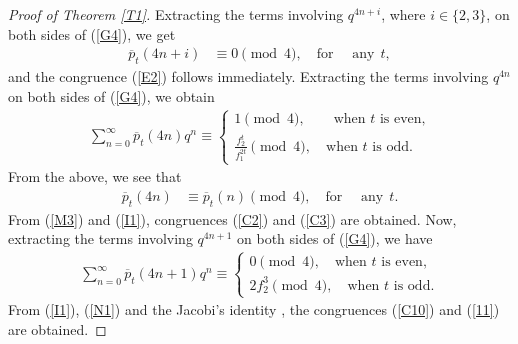\documentclass[12pt,reqno,a4paper]{amsart}
\numberwithin{equation}{section}
\begin{document}
\begin{proof}[Proof of Theorem \ref{T1}]
 Extracting the terms involving $q^{4n+i}$, where $i\in\{2,3\}$, on both sides of (\ref{G4}), we get
\begin{align}
       \label{M3} \overline{p}_{t}(4n+i)& \equiv 0\pmod{4}, \quad \textrm{for ~~ any} ~~ t,
    \end{align}
 and the congruence (\ref{E2}) follows immediately. Extracting the terms involving  $q^{4n}$ on both sides of (\ref{G4}), we obtain
     \begin{align*}
   \sum_{n=0}^\infty\overline{p}_{t}(4n)q^n\equiv \begin{cases}
       1 \pmod{4},\qquad \text{when $t$ is even,}\\
         \frac{f_2^{t}}{f_1^{2t}}\pmod{4},\quad \text{when $t$ is odd.}
   \end{cases}
\end{align*}
From the above, we see that
\begin{align}
     \label{I1}\overline{p}_{t}(4n)& \equiv \overline{p}_{t}(n)\pmod{4}, \quad \textrm{for ~~ any} ~~ t.
\end{align}
From (\ref{M3}) and (\ref{I1}), congruences (\ref{C2}) and (\ref{C3}) are obtained. Now, extracting the terms involving  $q^{4n+1}$ on both sides of (\ref{G4}), we have
  \begin{align}
  \label{N1}\sum_{n=0}^\infty\overline{p}_{t}(4n+1)q^n\equiv \begin{cases}
         0 \pmod{4}, \quad\text{when $t$ is even,}\\
         2f_2^3\pmod{4},\quad \text{when $t$ is odd.}
   \end{cases}
\end{align}
From (\ref{I1}), (\ref{N1}) and the Jacobi's identity \cite[Equation 5, p. 257]{jacobi}, the congruences (\ref{C10}) and (\ref{11}) are obtained. 
\end{proof}
\
      
\end{document}
